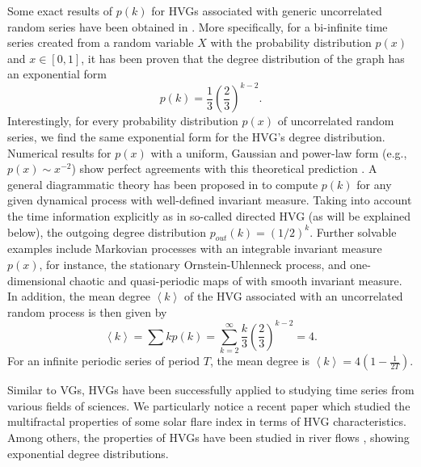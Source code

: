 		Some exact results of $p(k)$ for HVGs associated with generic uncorrelated random series have been obtained in \cite{Luque2009}. More specifically, for a bi-infinite time series created from a random variable $X$ with the probability distribution $p(x)$ and $x\in [0, 1]$, it has been proven that the degree distribution of the graph has an exponential form 
		\begin{equation}\label{pkhvg}
		p(k) = \frac{1}{3} \left(\frac{2}{3}\right)^{k-2}. 
		\end{equation}
Interestingly, for every probability distribution $p(x)$ of uncorrelated random series, we find the same exponential form for the HVG's degree distribution. Numerical results for $p(x)$ with a uniform, Gaussian and power-law form (e.g., $p(x) \sim x^{-2}$) show perfect agreements with this theoretical prediction \cite{Luque2009}. A general diagrammatic theory has been proposed in \cite{Lacasa2014b} to compute $p(k)$ for any given dynamical process with well-defined invariant measure. Taking into account the time information explicitly as in so-called directed HVG (as will be explained below), the outgoing degree distribution $p_{out}(k) = (1/2)^{k}$. Further solvable examples include Markovian processes with an integrable invariant measure $p(x)$, for instance, the stationary Ornstein-Uhlenneck process, and one-dimensional chaotic and quasi-periodic maps of with smooth invariant measure. In addition, the mean degree $\left< k \right>$ of the HVG associated with an uncorrelated random process is then given by 
\begin{equation}
\left< k \right> = \sum k p(k) = \sum_{k=2}^{\infty} \frac{k}{3}\left(\frac{2}{3}\right)^{k-2} = 4.
\end{equation}
For an infinite periodic series of period $T$, the mean degree is $\left< k \right> = 4 ( 1 - \frac{1}{2T})$. 
	
		Similar to VGs, HVGs have been successfully applied to studying time series from various fields of sciences. We particularly notice a recent paper \cite{Yu2012} which studied the multifractal properties of some solar flare index in terms of HVG characteristics. Among others, the properties of HVGs have been studied in river flows \cite{Braga2016}, showing exponential degree distributions. 
		
